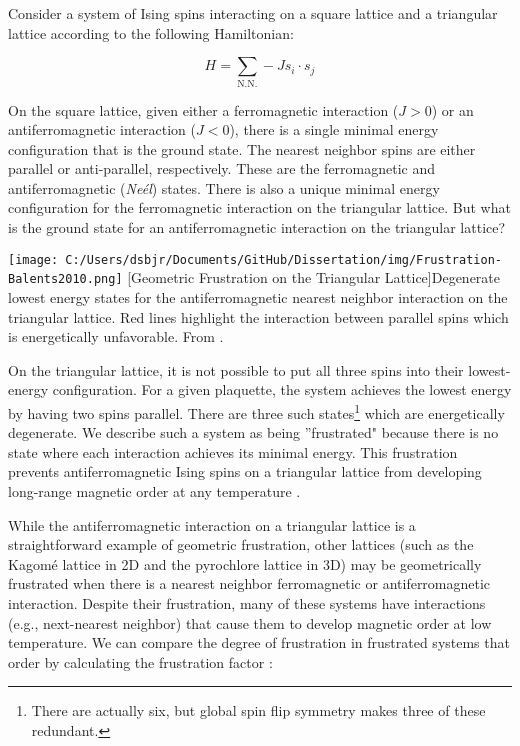 Consider a system of Ising spins interacting on a square lattice and a triangular lattice according to the following Hamiltonian: 

\begin{equation}
H = \sum_{\text{N.N.}} -J s_{i} \cdot s_{j}
\end{equation}

On the square lattice, given either a ferromagnetic interaction ($J > 0$) or an antiferromagnetic interaction ($J < 0$), there is a single minimal energy configuration that is the ground state. The nearest neighbor spins are either parallel or anti-parallel, respectively. These are the ferromagnetic and antiferromagnetic (\textit{Ne{\'e}l}) states. There is also a unique minimal energy configuration for the ferromagnetic interaction on the triangular lattice. But what is the ground state for an antiferromagnetic interaction on the triangular lattice?

\begin{centering}
\texttt{[image: C:/Users/dsbjr/Documents/GitHub/Dissertation/img/Frustration-Balents2010.png]}
  \captionsetup{width=0.75\textwidth}
  [Geometric Frustration on the Triangular Lattice]{Degenerate lowest energy states for the antiferromagnetic nearest neighbor interaction on the triangular lattice. Red lines highlight the interaction between parallel spins which is energetically unfavorable. From \cite{Balents2010}.}
  \label{fig:Frustration1}
\end{centering}

On the triangular lattice, it is not possible to put all three spins into their lowest-energy configuration. For a given plaquette, the system achieves the lowest energy by having two spins parallel. There are three such states\footnote{There are actually six, but global spin flip symmetry makes three of these redundant.} which are energetically degenerate. We describe such a system as being ''frustrated" because there is no state where each interaction achieves its minimal energy. This frustration prevents antiferromagnetic Ising spins on a triangular lattice from developing long-range magnetic order at any temperature \cite{Wannier1950}.

While the antiferromagnetic interaction on a triangular lattice is a straightforward example of geometric frustration, other lattices (such as the Kagom{\'e} lattice in 2D and the pyrochlore lattice in 3D) may be geometrically frustrated when there is a nearest neighbor ferromagnetic or antiferromagnetic interaction. Despite their frustration, many of these systems have interactions (e.g., next-nearest neighbor) that cause them to develop magnetic order at low temperature. We can compare the degree of frustration in frustrated systems that order by calculating the frustration factor \cite{Ramirez1994}:

